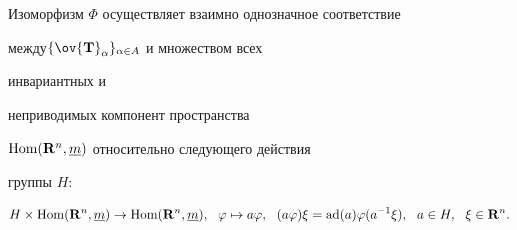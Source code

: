 \begin{thm} 


Изоморфизм $\Phi$ осуществляет взаимно однозначное соответствие 


между\linebreak $\{\ov{\bold T}_\alpha\}_{\alpha\in A}$ и множеством всех 


инвариантных и 


неприводимых компонент пространства\linebreak


$\operatorname{Hom}(\bold R^n,\underline m)$ относительно следующего действия 


группы $H{:}$ 


\begin{equation} 


H\times\Hom(\bold R^n,\ul m)\to\Hom(\bold R^n,\ul m),


\ \ \varphi\mapsto a\varphi,\ \ 


(a\varphi)\xi=\ad(a)\varphi(a^{-1}\xi),\ \ a\in H, 


\ \ \xi\in\bold R^n. 


\end{equation} 


\end{thm} 


 


